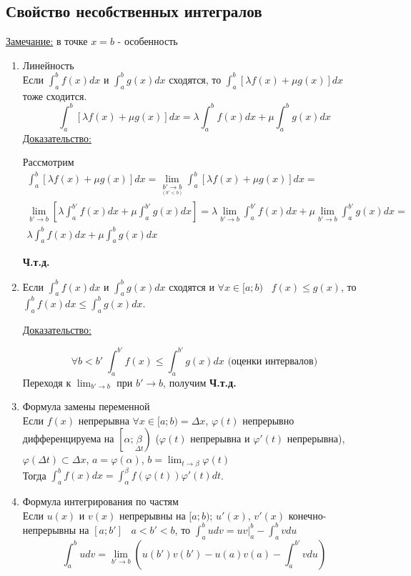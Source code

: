 \documentclass[12pt]{article}
\begin{document}
    \subsection{Свойство несобственных интегралов}
    \underline{Замечание:} в точке $x=b$ - особенность
    \begin{enumerate}
        \item Линейность\\
        Если $\int_{a}^{b}f(x)dx$ и $\int_{a}^{b} g(x)dx$ сходятся, то $\int_{a}^{b} [\lambda f(x)+\mu g(x)]dx$ тоже сходится.
        \[ \int_{a}^{b}[\lambda f(x)+\mu g(x)]dx=\lambda \int_{a}^{b} f(x)dx + \mu \int_{a}^{b}g(x)dx \]\noindent
        \underline{Доказательство:}
        \begin{adjustwidth}{1.5em}{1.5em}
            Рассмотрим 
            \begin{gather*}
                \int_{a}^{b}[\lambda f(x)+\mu g(x)]dx=\lim_{\underset{(b' < b)}{b' \to b}} \int_{a}^{b}\left[\lambda f(x)+\mu g(x)\right]dx= \\ \lim_{b' \to b}\left[\lambda \int_{a}^{b'}f(x)dx+\mu \int_{a}^{b'}g(x)dx\right]=
                \lambda\lim_{b' \to b} \int_{a}^{b'}f(x)dx+\mu\lim_{b' \to b}\int_{a}^{b'}g(x)dx=\\ \lambda \int_{a}^{b}f(x)dx+\mu \int_{a}^{b}g(x)dx
            \end{gather*}
            \begin{center}
                \textbf{Ч.т.д.}
            \end{center}
        \end{adjustwidth}
        \item Если $\int_{a}^{b} f(x)dx$ и $\int_{a}^{b} g(x)dx$ сходятся и $\forall x \in [a;b) \;\;\; f(x) \leq g(x)$, то $\int_{a}^{b}f(x)dx \leq \int_{a}^{b}g(x)dx$.\par\noindent
        \underline{Доказательство:}
        \begin{adjustwidth}{1.5em}{1.5em}
            \[ \forall b<b' \; \int_{a}^{b'} f(x) \leq \int_{a}^{b'} g(x)dx \text{ (оценки интервалов)}\]
            Переходя к $\lim_{b' \to b}$ при $b' \to b$, получим \textbf{Ч.т.д.}
        \end{adjustwidth}
        \item Формула замены переменной\\
        Если $f(x)$ непрерывна $\forall x \in [a;b) = \Delta x$, $\varphi(t)$ непрерывно дифференцируема на $\left[\alpha;\underset{\Delta t}{\beta}\right)$ ($\varphi(t)$ непрерывна и $\varphi'(t)$ непрерывна), $\varphi(\Delta t) \subset \Delta x$, $a=\varphi(\alpha)$, $b=\lim_{t \to \beta}\varphi(t)$\\
        Тогда $\int_{a}^{b}f(x)dx=\int_{\alpha}^{\beta} f(\varphi(t))\varphi'(t)dt$.
        \item Формула интегрирования по частям\\
        Если $u(x)$ и $v(x)$ непрерывны на $[a;b)$; $u'(x)$, $v'(x)$ конечно-непрерывны на $[a;b'] \;\;\; a<b'<b$, то $\int_{a}^{b}udv=uv\Big|^b_a - \int_{a}^{b}vdu$
        \[ \int_{a}^{b}udv=\lim_{b' \to b} \left(u(b')v(b')-u(a)v(a)-\int_{a}^{b'}vdu\right) \]
    \end{enumerate}
\end{document}
